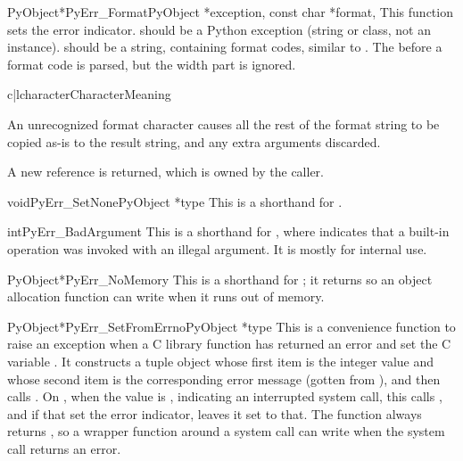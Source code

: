 \documentclass{manual}
\begin{document}
\begin{cfuncdesc}{PyObject*}{PyErr_Format}{PyObject *exception,
                                           const char *format, \moreargs}
This function sets the error indicator.   should be a
Python exception (string or class, not an instance).
 should be a string, containing format codes, similar to 
. The  before a format code
is parsed, but the width part is ignored.

\begin{tableii}{c|l}{character}{Character}{Meaning}
\end{tableii}

An unrecognized format character causes all the rest of
the format string to be copied as-is to the result string,
and any extra arguments discarded.

A new reference is returned, which is owned by the caller.
\end{cfuncdesc}

\begin{cfuncdesc}{void}{PyErr_SetNone}{PyObject *type}
This is a shorthand for .
\end{cfuncdesc}

\begin{cfuncdesc}{int}{PyErr_BadArgument}{}
This is a shorthand for , where  indicates that a built-in operation
was invoked with an illegal argument.  It is mostly for internal use.
\end{cfuncdesc}

\begin{cfuncdesc}{PyObject*}{PyErr_NoMemory}{}
This is a shorthand for ; it
returns \NULL{} so an object allocation function can write
 when it runs out of memory.
\end{cfuncdesc}

\begin{cfuncdesc}{PyObject*}{PyErr_SetFromErrno}{PyObject *type}
This is a convenience function to raise an exception when a C library
function has returned an error and set the C variable .
It constructs a tuple object whose first item is the integer
 value and whose second item is the corresponding error
message (gotten from ), and
then calls
.  On \UNIX{}, when
the  value is , indicating an interrupted
system call, this calls , and if that set
the error indicator, leaves it set to that.  The function always
returns \NULL{}, so a wrapper function around a system call can write 
 when  the system call returns an
error.
\end{cfuncdesc}
\end{document}
